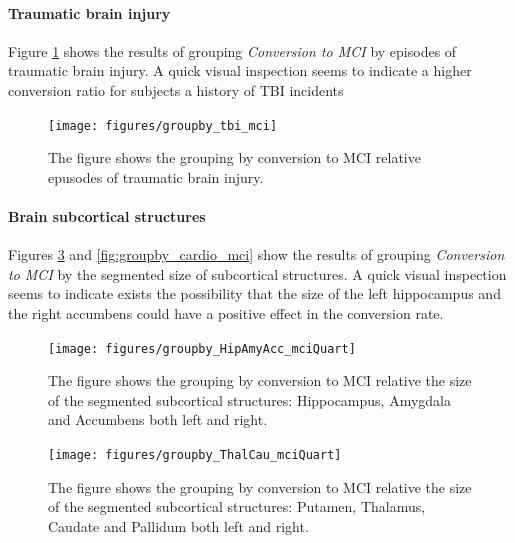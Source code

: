 \documentclass[11pt]{article}
\theoremstyle{definition}
\theoremstyle{remark}
\begin{document}
\paragraph*{Traumatic brain injury}
Figure \ref{fig:groupby_tbi_mci} shows the results of grouping \emph{Conversion to MCI} by episodes of traumatic brain injury. A quick visual inspection seems to indicate a higher conversion ratio for subjects a history of TBI incidents

\begin{figure}[H]
        \centering
        \texttt{[image: figures/groupby\_tbi\_mci]}
        \caption{The figure shows the grouping by conversion to MCI relative epusodes of traumatic brain injury.}
        \label{fig:groupby_tbi_mci}
\end{figure}



\paragraph{Brain subcortical structures}

Figures \ref{fig:groupby_HipAmyAcc_mciQuart} and \ref{fig:groupby_cardio_mci} show the results of grouping \emph{Conversion to MCI} by the segmented size of subcortical structures. 
A quick visual inspection seems to indicate exists the possibility that the size of the left hippocampus and the right accumbens could have a positive effect in the conversion rate.

\begin{figure}[H]
        \centering
        \texttt{[image: figures/groupby\_HipAmyAcc\_mciQuart]}
        \caption{The figure shows the grouping by conversion to MCI relative the size of the segmented subcortical structures: Hippocampus, Amygdala and Accumbens both left and right.}
        \label{fig:groupby_HipAmyAcc_mciQuart}
\end{figure}

\begin{figure}[H]
        \centering
        \texttt{[image: figures/groupby\_ThalCau\_mciQuart]}
        \caption{The figure shows the grouping by conversion to MCI relative the size of the segmented subcortical structures: Putamen, Thalamus, Caudate and Pallidum both left and right.}
        \label{fig:groupby_HipAmyAcc_mciQuart}
\end{figure}
\end{document}
